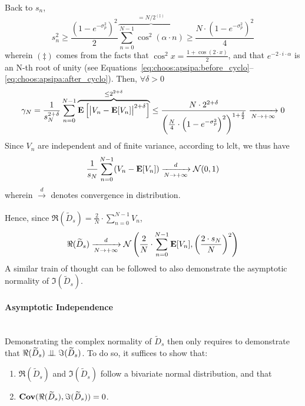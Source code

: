 Back to $s_n$,
\begin{equation}
	s_n^2 \geq \frac{\left(1-e^{-\sigma_p^2}\right)^2}{2} \overbrace{\sum_{n=0}^{N-1} \cos^2(\alpha \cdot n)}^{=N/2^{(\ddagger)}} \geq \frac{N \cdot \left(1-e^{-\sigma_p^2}\right)^2}{4}
\end{equation}
wherein $(\ddagger)$ comes from the facts that $\cos^2 x = \frac{1+\cos(2\cdot x)}{2}$, and that $e^{-2\cdot i \cdot \alpha}$ is an N-th root of unity (see Equations~\ref{eq:choos:apsipa:before_cyclo}--\ref{eq:choos:apsipa:after_cyclo}). Then, $\forall \delta > 0$
\begin{equation}
	\gamma_N = \frac{1}{s_N^{2+\delta}} \sum_{n=0}^{N-1} \overbrace{\mathbf{E} \left[\big|V_n - \mathbf{E}[V_n]\big|^{2+\delta}\right]}^{\leq 2^{2+\delta}} \leq \frac{N \cdot 2^{2+\delta}}{\left(\frac{N}{4} \cdot \left(1-e^{-\sigma_p^2}\right)^2\right)^{1+\frac{\delta}{2}}} \xrightarrow[N\rightarrow +\infty]{} 0
\end{equation}
Since $V_n$ are independent and of finite variance, according to \gls{lclt}, we thus have
\begin{equation}
	\frac{1}{s_N} \sum_{n=0}^{N-1} (V_n - \mathbf{E}[V_n]) \xrightarrow[N\rightarrow +\infty]{d} \mathcal{N}(0,1)
\end{equation}
wherein $\xrightarrow[]{d}$ denotes convergence in distribution. 

Hence, since $\Re(\widetilde{D}_s) = \frac{2}{N} \cdot \sum_{n=0}^{N-1} V_n$,
\begin{equation}
	\Re(\widetilde{D}_s) \xrightarrow[N\rightarrow +\infty]{d} \mathcal{N} \left( \frac{2}{N}\cdot \sum_{n=0}^{N-1} \mathbf{E} [V_n], \left(\frac{2 \cdot s_N}{N}\right)^2 \right)
\end{equation}
A similar train of thought can be followed to also demonstrate the asymptotic normality of $\Im(\widetilde{D}_s)$.

\paragraph{Asymptotic Independence}\mbox{}\\

Demonstrating the complex normality of $\widetilde{D}_s$ then only requires to demonstrate that $\Re(\widetilde{D}_s) \mathrel{\perp\!\!\!\perp} \Im(\widetilde{D}_s)$. To do so, it suffices to show that\cite[Th. 4.5-1]{hogg2014}:
\begin{enumerate}[label=\textit{(\roman*)}]
	\item $\Re(\widetilde{D}_s)$ and $\Im(\widetilde{D}_s)$ follow a bivariate normal distribution, and that
	\item $\mathbf{Cov} (\Re(\widetilde{D}_s), \Im(\widetilde{D}_s)) = 0$.
\end{enumerate}

